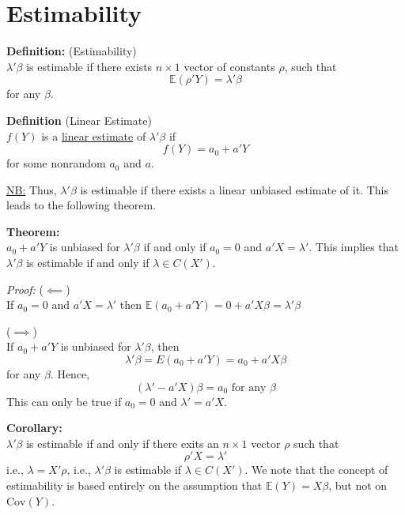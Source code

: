 \documentclass[12pt]{article}
\newcommand{\E}{\mathbb{E}}
\newcommand{\Cov}{\mathrm{Cov}}
\numberwithin{equation}{section}
\begin{document}
\section{Estimability}
\textbf{Definition:} (Estimability) \\
$\lambda ' \beta$ is estimable if there exists $n \times 1$ vector of constants $\rho$, such that
\begin{equation*}
  \E(\rho'Y) = \lambda' \beta
\end{equation*}
for any $\beta$.

\textbf{Definition} (Linear Estimate) \\
$f(Y)$ is a \underline{linear estimate} of $\lambda ' \beta$ if
\begin{equation*}
  f(Y) = a_0 + a'Y
\end{equation*}
for some nonrandom $a_0$ and $a$.

\underline{NB:} Thus, $\lambda' \beta$ is estimable if there exists a linear unbiased estimate of it. This leads to the following theorem.

\textbf{Theorem:} \\
$a_0 + a'Y$ is unbiased for $\lambda' \beta$ if and only if $a_0 = 0$ and $a'X = \lambda'$. This implies that $\lambda' \beta$ is estimable if and only if $\lambda \in C(X')$.

\textit{Proof:}
($\impliedby$) \\
If $a_0 = 0$ and $a'X = \lambda'$ then $\E(a_0 + a'Y) = 0 + a'X \beta = \lambda' \beta$

($\implies$) \\
If $a_0 + a'Y$ is unbiased for $\lambda' \beta$, then
\begin{equation*}
  \lambda' \beta = E(a_0 + a'Y) = a_0 + a'X\beta
\end{equation*}
for any $\beta$. Hence,
\begin{equation*}
  (\lambda' - a'X)\beta = a_0 \text{ for any } \beta
\end{equation*}
This can only be true if $a_0 = 0$ and $\lambda' = a'X$.

\textbf{Corollary:} \\
$\lambda ' \beta$ is estimable if and only if there exits an $n \times 1$ vector $\rho$ such that
\begin{equation*}
  \rho ' X = \lambda '
\end{equation*}
i.e., $\lambda = X' \rho$, i.e., $\lambda ' \beta$ is estimable if $\lambda \in C(X')$. We note that the concept of estimability is based entirely on the assumption that $\E(Y) = X\beta$, but not on $\Cov(Y)$.
\end{document}
